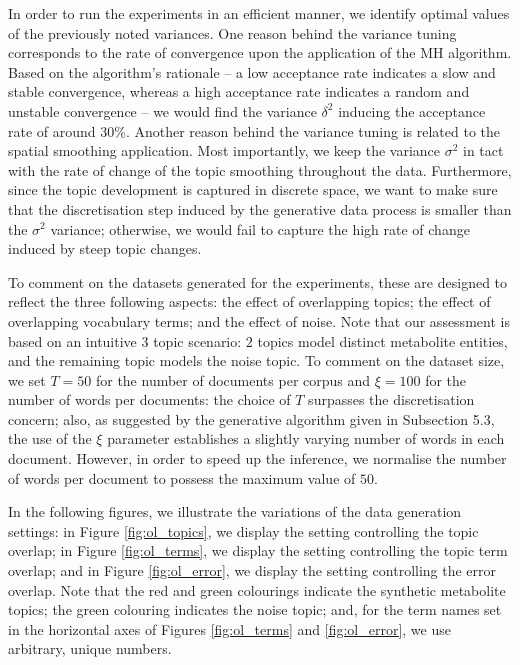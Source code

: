\documentclass{mpaper}
\begin{document}
\par In order to run the experiments in an efficient manner, we identify optimal values of the previously noted variances. One reason behind the variance tuning corresponds to the rate of convergence upon the application of the MH algorithm. Based on the algorithm's rationale -- a low acceptance rate indicates a slow and stable convergence, whereas a high acceptance rate indicates a random and unstable convergence -- we would find the variance $\delta^2$ inducing the acceptance rate of around $30\%$. Another reason behind the variance tuning is related to the spatial smoothing application. Most importantly, we keep the variance $\sigma^2$ in tact with the rate of change of the topic smoothing throughout the data. Furthermore, since the topic development is captured in discrete space, we want to make sure that the discretisation step induced by the generative data process is smaller than the $\sigma^2$ variance; otherwise, we would fail to capture the high rate of change induced by steep topic changes.
\par To comment on the datasets generated for the experiments, these are designed to reflect the three following aspects: the effect of overlapping topics; the effect of overlapping vocabulary terms; and the effect of noise. Note that our assessment is based on an intuitive $3$ topic scenario: $2$ topics model distinct metabolite entities, and the remaining topic models the noise topic. To comment on the dataset size, we set $T=50$ for the number of documents per corpus and $\xi=100$ for the number of words per documents: the choice of $T$ surpasses the discretisation concern; also, as suggested by the generative algorithm given in Subsection 5.3, the use of the $\xi$ parameter establishes a slightly varying number of words in each document. However, in order to speed up the inference, we normalise the number of words per document to possess the maximum value of $50$.

\par In the following figures, we illustrate the variations of the data generation settings: in Figure \ref{fig:ol_topics}, we display the setting  controlling the topic overlap; in Figure \ref{fig:ol_terms}, we display the setting controlling the topic term overlap; and in Figure \ref{fig:ol_error}, we display the setting controlling the error overlap. Note that the red and green colourings indicate the synthetic metabolite topics; the green colouring indicates the noise topic; and, for the term names set in the horizontal axes of Figures \ref{fig:ol_terms} and \ref{fig:ol_error}, we use arbitrary, unique numbers. 
\end{document}

